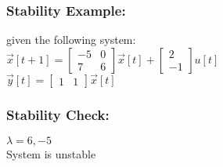 

\begin{frame}
\frametitle{Stability Example:}

given the following system: \\
$\vec{x}[t+1] = 
\begin{bmatrix}
-5 & 0 \\
7 & 6
\end{bmatrix}
\vec{x}[t] + 
\begin{bmatrix}
2 \\
-1
\end{bmatrix}
u[t]$\\
$
\vec{y}[t] =
\begin{bmatrix}
1 & 1
\end{bmatrix}
\vec{x}[t]$
\end{frame}

\begin{frame}
\frametitle{Stability Check:}

$\lambda = 6, -5$\\ \pause
System is unstable
\end{frame}





